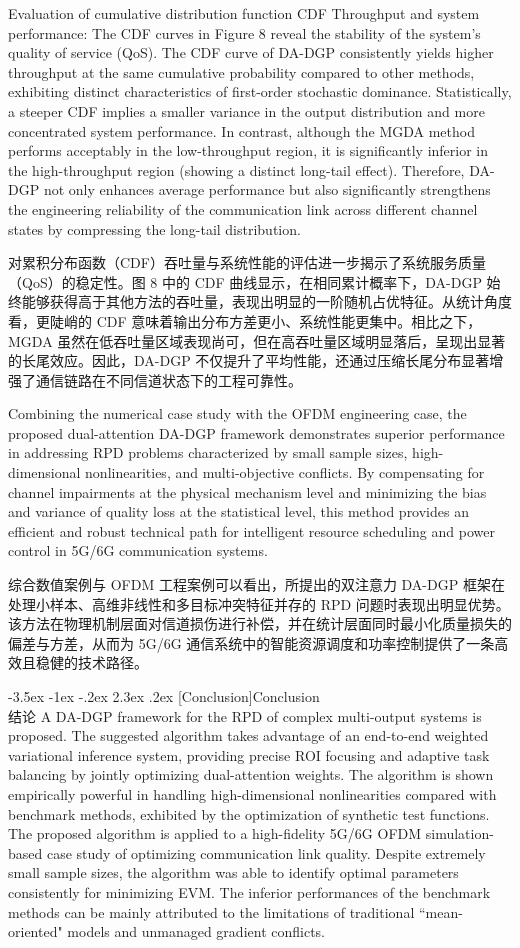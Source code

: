 \documentclass[11pt]{article}
\makeatletter
\renewcommand\section{\@startsection {section}{1}{\z@}%
                                       {-3.5ex \@plus -1ex \@minus -.2ex}%
                                       {2.3ex \@plus.2ex}%
                                       {\normalfont\fontfamily{phv}\fontsize{16}{19}\bfseries}}
\newcommand{\bisection}[2]{\section[#1]{#1\protect\\#2}}
\makeatother
\begin{document}
Evaluation of cumulative distribution function CDF Throughput and system performance: The CDF curves in Figure 8 reveal the stability of the system's quality of service (QoS). The CDF curve of DA-DGP consistently yields higher throughput at the same cumulative probability compared to other methods, exhibiting distinct characteristics of first-order stochastic dominance. Statistically, a steeper CDF implies a smaller variance in the output distribution and more concentrated system performance. In contrast, although the MGDA method performs acceptably in the low-throughput region, it is significantly inferior in the high-throughput region (showing a distinct long-tail effect). Therefore, DA-DGP not only enhances average performance but also significantly strengthens the engineering reliability of the communication link across different channel states by compressing the long-tail distribution.

对累积分布函数（CDF）吞吐量与系统性能的评估进一步揭示了系统服务质量（QoS）的稳定性。图 8 中的 CDF 曲线显示，在相同累计概率下，DA-DGP 始终能够获得高于其他方法的吞吐量，表现出明显的一阶随机占优特征。从统计角度看，更陡峭的 CDF 意味着输出分布方差更小、系统性能更集中。相比之下，MGDA 虽然在低吞吐量区域表现尚可，但在高吞吐量区域明显落后，呈现出显著的长尾效应。因此，DA-DGP 不仅提升了平均性能，还通过压缩长尾分布显著增强了通信链路在不同信道状态下的工程可靠性。

Combining the numerical case study with the OFDM engineering case, the proposed dual-attention DA-DGP framework demonstrates superior performance in addressing RPD problems characterized by small sample sizes, high-dimensional nonlinearities, and multi-objective conflicts. By compensating for channel impairments at the physical mechanism level and minimizing the bias and variance of quality loss at the statistical level, this method provides an efficient and robust technical path for intelligent resource scheduling and power control in 5G/6G communication systems.

综合数值案例与 OFDM 工程案例可以看出，所提出的双注意力 DA-DGP 框架在处理小样本、高维非线性和多目标冲突特征并存的 RPD 问题时表现出明显优势。该方法在物理机制层面对信道损伤进行补偿，并在统计层面同时最小化质量损失的偏差与方差，从而为 5G/6G 通信系统中的智能资源调度和功率控制提供了一条高效且稳健的技术路径。


\bisection{Conclusion}{结论}  \label{s:sec5}
A DA-DGP framework for the RPD of complex multi-output systems is proposed. The suggested algorithm takes advantage of an end-to-end weighted variational inference system, providing precise ROI focusing and adaptive task balancing by jointly optimizing dual-attention weights. The algorithm is shown empirically powerful in handling high-dimensional nonlinearities compared with benchmark methods, exhibited by the optimization of synthetic test functions. The proposed algorithm is applied to a high-fidelity 5G/6G OFDM simulation-based case study of optimizing communication link quality. Despite extremely small sample sizes, the algorithm was able to identify optimal parameters consistently for minimizing EVM. The inferior performances of the benchmark methods can be mainly attributed to the limitations of traditional ``mean-oriented" models and unmanaged gradient conflicts.
\end{document}
